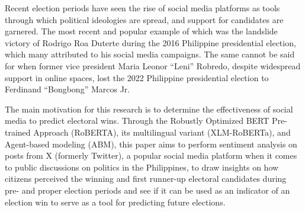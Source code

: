 \begin{thesisabstract}
Recent election periods have seen the rise of social media platforms as tools through which political ideologies are spread, and support for candidates are garnered. The most recent and popular example of which was the landslide victory of Rodrigo Roa Duterte during the 2016 Philippine presidential election, which many attributed to his social media campaigns. The same cannot be said for when former vice president Maria Leonor “Leni” Robredo, despite widespread support in online spaces, lost the 2022 Philippine presidential election to Ferdinand “Bongbong” Marcos Jr. 

The main motivation for this research is to determine the effectiveness of social media to predict electoral wins. Through the Robustly Optimized BERT Pre-trained Approach (RoBERTA), its multilingual variant (XLM-RoBERTa), and Agent-based modeling (ABM), this paper aims to perform sentiment analysis on posts from X (formerly Twitter), a popular social media platform when it comes to public discussions on politics in the Philippines, to draw insights on how citizens perceived the winning and first runner-up electoral candidates during pre- and proper election periods and see if it can be used as an indicator of an election win to serve as a tool for predicting future elections.
\end{thesisabstract}